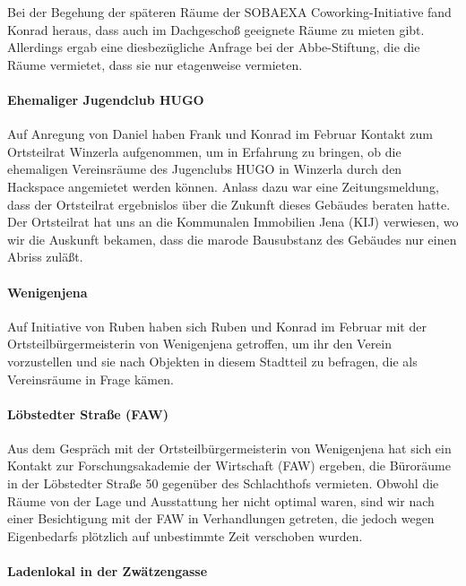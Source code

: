 \documentclass[10pt,DIV16]{scrartcl}
\begin{document}
Bei der Begehung der späteren Räume der SOBAEXA Coworking-Initiative fand
Konrad heraus, dass auch im Dachgeschoß geeignete Räume zu mieten gibt.
Allerdings ergab eine diesbezügliche Anfrage bei der Abbe-Stiftung, die die
Räume vermietet, dass sie nur etagenweise vermieten.

\paragraph{Ehemaliger Jugendclub HUGO}

Auf Anregung von Daniel haben Frank und Konrad im Februar Kontakt zum
Ortsteilrat Winzerla aufgenommen, um in Erfahrung zu bringen, ob die
ehemaligen Vereinsräume des Jugenclubs HUGO in Winzerla durch den Hackspace
angemietet werden können.  Anlass dazu war eine Zeitungsmeldung, dass der
Ortsteilrat ergebnislos über die Zukunft dieses Gebäudes beraten hatte.  Der
Ortsteilrat hat uns an die Kommunalen Immobilien Jena (KIJ) verwiesen, wo wir
die Auskunft bekamen, dass die marode Bausubstanz des Gebäudes nur einen
Abriss zuläßt.

\paragraph{Wenigenjena}

Auf Initiative von Ruben haben sich Ruben und Konrad im Februar mit der
Orts\-teil\-bür\-ger\-meis\-te\-rin von Wenigenjena getroffen, um ihr den
Verein vorzustellen und sie nach Objekten in diesem Stadtteil zu befragen, die
als Vereinsräume in Frage kämen.

\paragraph{Löbstedter Straße (FAW)}

Aus dem Gespräch mit der Ortsteilbürgermeisterin von Wenigenjena hat sich ein
Kontakt zur Forschungsakademie der Wirtschaft (FAW) ergeben, die Büroräume in
der Löbstedter Straße 50 gegenüber des Schlachthofs vermieten.  Obwohl die
Räume von der Lage und Ausstattung her nicht optimal waren, sind wir nach
einer Besichtigung mit der FAW in Verhandlungen getreten, die jedoch wegen
Eigenbedarfs plötzlich auf unbestimmte Zeit verschoben wurden.

\paragraph{Ladenlokal in der Zwätzengasse}
\end{document}
